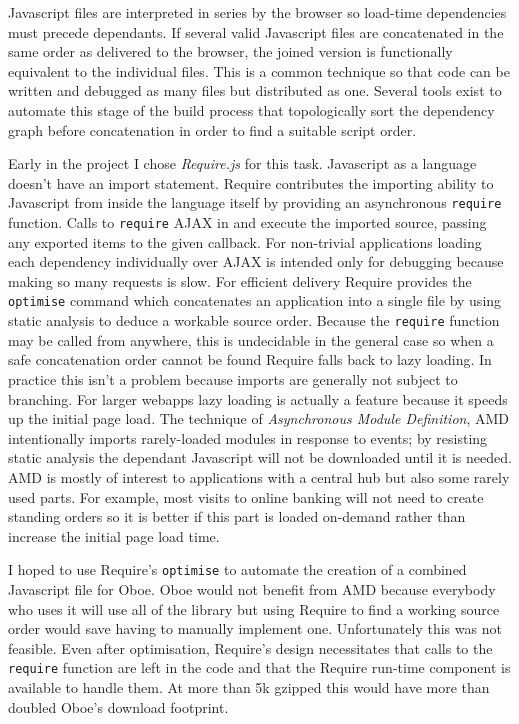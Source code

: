 \documentclass[12pt, ]{article}
\begin{document}
Javascript files are interpreted in series by the browser so load-time
dependencies must precede dependants. If several valid Javascript files
are concatenated in the same order as delivered to the browser, the
joined version is functionally equivalent to the individual files. This
is a common technique so that code can be written and debugged as many
files but distributed as one. Several tools exist to automate this stage
of the build process that topologically sort the dependency graph before
concatenation in order to find a suitable script order.

Early in the project I chose \emph{Require.js} for this task. Javascript
as a language doesn't have an import statement. Require contributes the
importing ability to Javascript from inside the language itself by
providing an asynchronous \texttt{require} function. Calls to
\texttt{require} AJAX in and execute the imported source, passing any
exported items to the given callback. For non-trivial applications
loading each dependency individually over AJAX is intended only for
debugging because making so many requests is slow. For efficient
delivery Require provides the \texttt{optimise} command which
concatenates an application into a single file by using static analysis
to deduce a workable source order. Because the \texttt{require} function
may be called from anywhere, this is undecidable in the general case so
when a safe concatenation order cannot be found Require falls back to
lazy loading. In practice this isn't a problem because imports are
generally not subject to branching. For larger webapps lazy loading is
actually a feature because it speeds up the initial page load. The
technique of \emph{Asynchronous Module Definition}, AMD intentionally
imports rarely-loaded modules in response to events; by resisting static
analysis the dependant Javascript will not be downloaded until it is
needed. AMD is mostly of interest to applications with a central hub but
also some rarely used parts. For example, most visits to online banking
will not need to create standing orders so it is better if this part is
loaded on-demand rather than increase the initial page load time.

I hoped to use Require's \texttt{optimise} to automate the creation of a
combined Javascript file for Oboe. Oboe would not benefit from AMD
because everybody who uses it will use all of the library but using
Require to find a working source order would save having to manually
implement one. Unfortunately this was not feasible. Even after
optimisation, Require's design necessitates that calls to the
\texttt{require} function are left in the code and that the Require
run-time component is available to handle them. At more than 5k gzipped
this would have more than doubled Oboe's download footprint.
\end{document}
